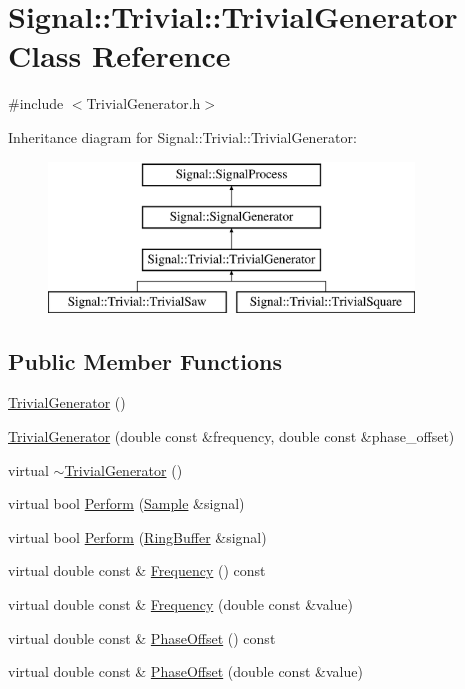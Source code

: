 \hypertarget{classSignal_1_1Trivial_1_1TrivialGenerator}{\section{Signal\+:\+:Trivial\+:\+:Trivial\+Generator Class Reference}
\label{classSignal_1_1Trivial_1_1TrivialGenerator}
}


{\ttfamily \#include $<$Trivial\+Generator.\+h$>$}

Inheritance diagram for Signal\+:\+:Trivial\+:\+:Trivial\+Generator\+:\begin{figure}[H]
\begin{center}
\leavevmode
\includegraphics[height=4.000000cm]{classSignal_1_1Trivial_1_1TrivialGenerator}
\end{center}
\end{figure}
\subsection*{Public Member Functions}
\begin{DoxyCompactItemize}
\item 
\hyperlink{classSignal_1_1Trivial_1_1TrivialGenerator_a70144a2d2bfb70e85e1a5840592c2cab}{Trivial\+Generator} ()
\item 
\hyperlink{classSignal_1_1Trivial_1_1TrivialGenerator_a82b5660a0dd8d504f803e4f21f5b236c}{Trivial\+Generator} (double const \&frequency, double const \&phase\+\_\+offset)
\item 
virtual \hyperlink{classSignal_1_1Trivial_1_1TrivialGenerator_a83a3f2ee88ed4c032f7103b2776c0871}{$\sim$\+Trivial\+Generator} ()
\item 
virtual bool \hyperlink{classSignal_1_1Trivial_1_1TrivialGenerator_a2394cf9d0d40f9d25f72aff03e372ad9}{Perform} (\hyperlink{classSignal_1_1Sample}{Sample} \&signal)
\item 
virtual bool \hyperlink{classSignal_1_1Trivial_1_1TrivialGenerator_a232aefbb2815eaf25e697ecedeb0f3d9}{Perform} (\hyperlink{classSignal_1_1RingBuffer}{Ring\+Buffer} \&signal)
\item 
virtual double const \& \hyperlink{classSignal_1_1SignalGenerator_a96af42ee68f94e9b04d034fd68b73ecd}{Frequency} () const 
\item 
virtual double const \& \hyperlink{classSignal_1_1SignalGenerator_af83b532bf3ddc3637c2fd7a1dfd095cb}{Frequency} (double const \&value)
\item 
virtual double const \& \hyperlink{classSignal_1_1SignalGenerator_ac2538ec946f001e394d2416fda698d1c}{Phase\+Offset} () const 
\item 
virtual double const \& \hyperlink{classSignal_1_1SignalGenerator_ac6a103ff72beaa338f6d18c812522d78}{Phase\+Offset} (double const \&value)
\end{DoxyCompactItemize}

